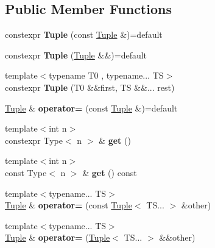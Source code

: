 \subsection*{Public Member Functions}
\begin{DoxyCompactItemize}
\item 
\hypertarget{classTuple_a2d1b31d7c3348d4cac0ea6c6cf8c51a6}{}\label{classTuple_a2d1b31d7c3348d4cac0ea6c6cf8c51a6} 
constexpr {\bfseries Tuple} (const \hyperlink{classTuple}{Tuple} \&)=default
\item 
\hypertarget{classTuple_aa893187df7450ccdd075ff1998e984e4}{}\label{classTuple_aa893187df7450ccdd075ff1998e984e4} 
constexpr {\bfseries Tuple} (\hyperlink{classTuple}{Tuple} \&\&)=default
\item 
\hypertarget{classTuple_a3f2ee8fe6431b8099ab3dd368714355e}{}\label{classTuple_a3f2ee8fe6431b8099ab3dd368714355e} 
{\footnotesize template$<$typename T0 , typename... TS$>$ }\\constexpr {\bfseries Tuple} (T0 \&\&first, TS \&\&... rest)
\item 
\hypertarget{classTuple_ace0700a860654c181c2cf5102af58791}{}\label{classTuple_ace0700a860654c181c2cf5102af58791} 
\hyperlink{classTuple}{Tuple} \& {\bfseries operator=} (const \hyperlink{classTuple}{Tuple} \&)=default
\item 
\hypertarget{classTuple_a6b356409e399ce1fbb0b2d2f5c23e9c7}{}\label{classTuple_a6b356409e399ce1fbb0b2d2f5c23e9c7} 
{\footnotesize template$<$int n$>$ }\\constexpr Type$<$ n $>$ \& {\bfseries get} ()
\item 
\hypertarget{classTuple_a86354406cdd34797d64f8292d9132f86}{}\label{classTuple_a86354406cdd34797d64f8292d9132f86} 
{\footnotesize template$<$int n$>$ }\\const Type$<$ n $>$ \& {\bfseries get} () const
\item 
\hypertarget{classTuple_a13b203605b6c25a672509b516a3f7d26}{}\label{classTuple_a13b203605b6c25a672509b516a3f7d26} 
{\footnotesize template$<$typename... TS$>$ }\\\hyperlink{classTuple}{Tuple} \& {\bfseries operator=} (const \hyperlink{classTuple}{Tuple}$<$ T\+S... $>$ \&other)
\item 
\hypertarget{classTuple_a5888493e6617e75d1e2ba1eae1b34e60}{}\label{classTuple_a5888493e6617e75d1e2ba1eae1b34e60} 
{\footnotesize template$<$typename... TS$>$ }\\\hyperlink{classTuple}{Tuple} \& {\bfseries operator=} (\hyperlink{classTuple}{Tuple}$<$ T\+S... $>$ \&\&other)
\end{DoxyCompactItemize}
